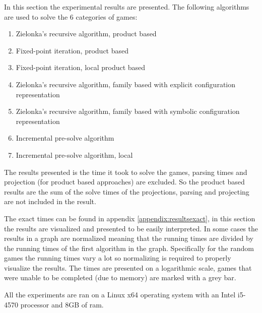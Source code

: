 In this section the experimental results are presented. The following algorithms are used to solve the 6 categories of games:
\begin{enumerate}
	\item Zielonka's recursive algorithm, product based
	\item Fixed-point iteration, product based
	\item Fixed-point iteration, local product based
	\item Zielonka's recursive algorithm, family based with explicit configuration representation
	\item Zielonka's recursive algorithm, family based with symbolic configuration representation
	\item Incremental pre-solve algorithm
	\item Incremental pre-solve algorithm, local
\end{enumerate}

The results presented is the time it took to solve the games, parsing times and projection (for product based approaches) are excluded. So the product based results are the sum of the solve times of the projections, parsing and projecting are not included in the result.

The exact times can be found in appendix \ref{appendix:resultsexact}, in this section the results are visualized and presented to be easily interpreted. In some cases the results in a graph are normalized meaning that the running times are divided by the running times of the first algorithm in the graph. Specifically for the random games the running times vary a lot so normalizing is required to properly visualize the results. The times are presented on a logarithmic scale, games that were unable to be completed (due to memory) are marked with a grey bar.

All the experiments are ran on a Linux x64 operating system with an Intel i5-4570 processor and 8GB of ram.
